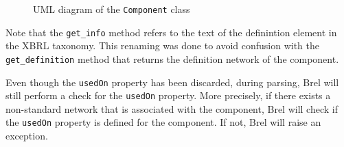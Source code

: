 \begin{figure}[H]
  \caption{UML diagram of the \texttt{Component} class}
  \label{fig:uml_component}
  \centering
\end{figure}

Note that the \texttt{get\_info} method refers to the text of the definintion element in the XBRL taxonomy.
This renaming was done to avoid confusion with the \texttt{get\_definition} method that returns the definition network of the component.

Even though the \texttt{usedOn} property has been discarded, during parsing, Brel will still perform a check for the \texttt{usedOn} property.
More precisely, if there exists a non-standard network that is associated with the component, Brel will check if the \texttt{usedOn} property is defined for the component.
If not, Brel will raise an exception.
